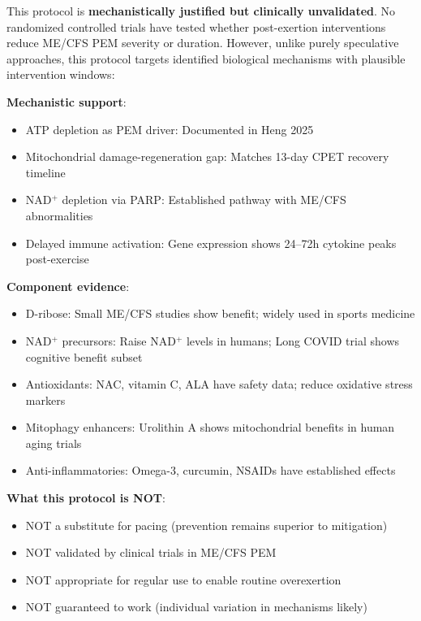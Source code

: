 \begin{warning}
This protocol is \textbf{mechanistically justified but clinically unvalidated}. No randomized controlled trials have tested whether post-exertion interventions reduce ME/CFS PEM severity or duration. However, unlike purely speculative approaches, this protocol targets identified biological mechanisms with plausible intervention windows:

\textbf{Mechanistic support}:
\begin{itemize}
    \item ATP depletion as PEM driver: Documented in Heng 2025~\cite{heng2025mecfs}
    \item Mitochondrial damage-regeneration gap: Matches 13-day CPET recovery timeline~\cite{keller2024cpet}
    \item NAD$^+$ depletion via PARP: Established pathway with ME/CFS abnormalities~\cite{heng2025mecfs}
    \item Delayed immune activation: Gene expression shows 24--72h cytokine peaks post-exercise
\end{itemize}

\textbf{Component evidence}:
\begin{itemize}
    \item D-ribose: Small ME/CFS studies show benefit; widely used in sports medicine
    \item NAD$^+$ precursors: Raise NAD$^+$ levels in humans; Long COVID trial shows cognitive benefit subset
    \item Antioxidants: NAC, vitamin C, ALA have safety data; reduce oxidative stress markers
    \item Mitophagy enhancers: Urolithin A shows mitochondrial benefits in human aging trials
    \item Anti-inflammatories: Omega-3, curcumin, NSAIDs have established effects
\end{itemize}

\textbf{What this protocol is NOT}:
\begin{itemize}
    \item NOT a substitute for pacing (prevention remains superior to mitigation)
    \item NOT validated by clinical trials in ME/CFS PEM
    \item NOT appropriate for regular use to enable routine overexertion
    \item NOT guaranteed to work (individual variation in mechanisms likely)
\end{itemize}


\end{warning}
